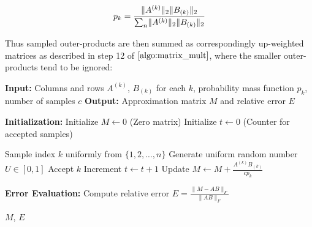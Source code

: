 \documentclass[onefignum,onetabnum]{siamart171218}
\DeclarePairedDelimiter\norm{\lVert}{\rVert}
\begin{document}
\begin{equation*}
p_k=\frac{\norm{A^{(k)}}_2\norm{B_{(k)}}_2}{\sum_n \norm{A^{(k)}}_2\norm{B_{(k)}}_2}
\end{equation*}

Thus sampled outer-products are then summed as correspondingly up-weighted matrices as described in step 12 of $\cref{algo:matrix_mult}$, where the smaller outer-products tend to be ignored:

\begin{algorithm}%
\caption{Randomized Low Rank Approximation of Matrix Multiplication}\label{algo:matrix_mult}
\begin{algorithmic}[1]
    \State \textbf{Input:} Columns and rows $A^{(k)}$, $B_{(k)}$ for each $k$, probability mass function $p_k$, number of samples $c$
    \State \textbf{Output:} Approximation matrix $M$ and relative error $E$
    \vspace{0.5em}
    
    \State \textbf{Initialization:}
    \State Initialize $M \gets 0$ (Zero matrix)
    \State Initialize $t \gets 0$ (Counter for accepted samples)
    
        \State Sample index $k$ uniformly from $\{1, 2, \hdots, n\}$
        \State Generate uniform random number $U \in [0, 1]$
            \State Accept $k$
            \State Increment $t \gets t + 1$
            \State Update $M \gets M + \frac{A^{(k)} B_{(k)}}{c p_k}$
        \EndIf
    \EndWhile

    \State \textbf{Error Evaluation:}
    \State Compute relative error $E = \frac{\|M - AB\|_F}{\|AB\|_F}$
    
    \State \Return $M$, $E$
\end{algorithmic}
\end{algorithm}
\end{document}
